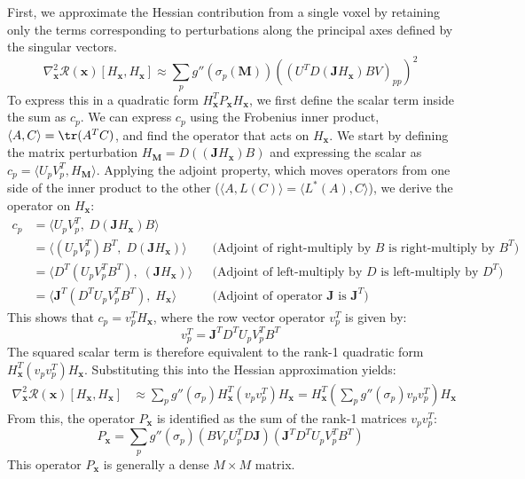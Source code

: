 First, we approximate the Hessian contribution from a single voxel by retaining only the terms corresponding to perturbations along the principal axes defined by the singular vectors.
\begin{equation}
    \nabla_{\mathbf{x}}^2 \mathcal{R}(\mathbf{x})[H_{\mathbf{x}},H_{\mathbf{x}}] \approx \sum_p g''(\sigma_p(\mathbf{M})) \left( \left(U^T D (\mathbf{J} H_{\mathbf{x}}) B V\right)_{pp} \right)^2
\end{equation}
To express this in a quadratic form $H_{\mathbf{x}}^T P_{\mathbf{x}} H_{\mathbf{x}}$, we first define the scalar term inside the sum as $c_p$. We can express $c_p$ using the Frobenius inner product, $\langle A, C \rangle = \tr(A^T C)$, and find the operator that acts on $H_{\mathbf{x}}$. We start by defining the matrix perturbation $H_{\mathbf{M}} = D ((\mathbf{J} H_{\mathbf{x}}) B)$ and expressing the scalar as $c_p = \langle U_p V_p^T, H_{\mathbf{M}} \rangle$. Applying the adjoint property, which moves operators from one side of the inner product to the other ($\langle A, L(C) \rangle = \langle L^*(A), C \rangle$), we derive the operator on $H_{\mathbf{x}}$:
\begin{align*}
    c_p &= \langle U_p V_p^T, \; D (\mathbf{J} H_{\mathbf{x}}) B \rangle \\
    &= \langle (U_p V_p^T) B^T, \; D (\mathbf{J} H_{\mathbf{x}}) \rangle 
    && \text{(Adjoint of right-multiply by $B$ is right-multiply by $B^T$)} \\
    &= \langle D^T (U_p V_p^T B^T), \; (\mathbf{J} H_{\mathbf{x}}) \rangle
    && \text{(Adjoint of left-multiply by $D$ is left-multiply by $D^T$)} \\
    &= \langle \mathbf{J}^T (D^T U_p V_p^T B^T), \; H_{\mathbf{x}} \rangle
    && \text{(Adjoint of operator $\mathbf{J}$ is $\mathbf{J}^T$)}
\end{align*}
This shows that $c_p = v_p^T H_{\mathbf{x}}$, where the row vector operator $v_p^T$ is given by:
\begin{equation}
    v_p^T = \mathbf{J}^T D^T U_p V_p^T B^T
\end{equation}
The squared scalar term is therefore equivalent to the rank-1 quadratic form $H_{\mathbf{x}}^T (v_p v_p^T) H_{\mathbf{x}}$. Substituting this into the Hessian approximation yields:
\begin{align*}
    \nabla_{\mathbf{x}}^2 \mathcal{R}(\mathbf{x})[H_{\mathbf{x}},H_{\mathbf{x}}] &\approx \sum_p g''(\sigma_p) H_{\mathbf{x}}^T \left(v_p v_p^T\right) H_{\mathbf{x}} = H_{\mathbf{x}}^T \left( \sum_p g''(\sigma_p) v_p v_p^T \right) H_{\mathbf{x}}
\end{align*}
From this, the operator $P_{\mathbf{x}}$ is identified as the sum of the rank-1 matrices $v_p v_p^T$:
\begin{equation}
    P_{\mathbf{x}} = \sum_p g''(\sigma_p) (B V_p U_p^T D \mathbf{J}) (\mathbf{J}^T D^T U_p V_p^T B^T )
\end{equation}
This operator $P_{\mathbf{x}}$ is generally a dense $M \times M$ matrix.

